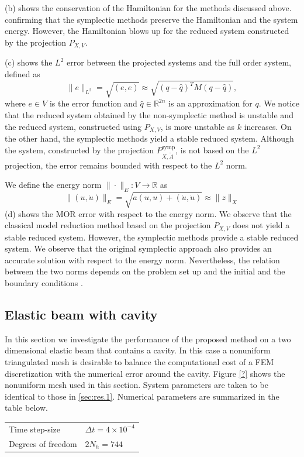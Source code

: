 (b) shows the conservation of the Hamiltonian for the methods discussed above. confirming that the symplectic methods preserve the Hamiltonian and the system energy. However, the Hamiltonian blows up for the reduced system constructed by the projection $P_{X,V}$.

(c) shows the $L^2$ error between the projected systems and the full order system, defined as
\begin{equation}
	\| e \|_{L^2} = \sqrt{(e,e)} \approx \sqrt{ (q - \hat q)^T M (q-\hat q) },
\end{equation}
where $e\in V$ is the error function and $\hat q \in \mathbb R^{2n}$ is an approximation for $q$. We notice that the reduced system obtained by the non-symplectic method is unstable and the reduced system, constructed using $P_{X,V}$, is more unstable as $k$ increases. On the other hand, the symplectic methods yield a stable reduced system. Although the system, constructed by the projection $P^{\text{symp}}_{X,\tilde A}$, is not based on the $L^2$ projection, the error remains bounded with respect to the $L^2$ norm. 

We define the energy norm $\| \cdot \|_E : V \to \mathbb R$ as
\begin{equation}
	\| (u,\dot u) \|_E = \sqrt{ a(u,u) + (\dot u , \dot u) } \approx \| z \|_X
\end{equation}
(d) shows the MOR error with respect to the energy norm. We observe that the classical model reduction method based on the projection $P_{X,V}$ does not yield a stable reduced system. However, the symplectic methods provide a stable reduced system. We observe that the original symplectic approach also provides an accurate solution with respect to the energy norm. Nevertheless, the relation between the two norms depends on the problem set up and the initial and the boundary conditions \cite{DEPARIS20094359}.

\subsection{Elastic beam with cavity} In this section we investigate the performance of the proposed method on a two dimensional elastic beam that contains a cavity. In this case a nonuniform triangulated mesh is desirable to balance the computational cost of a FEM discretization with the numerical error around the cavity. Figure \ref{?} shows the nonuniform mesh used in this section.
System parameters are taken to be identical to those in \cref{sec:res.1}. Numerical parameters are summarized in the table below.
\vspace{0.5cm}
\begin{center}
\begin{tabular}{|l|l|}
\hline
Time step-size & $\Delta t = 4\times 10^{-4}$ \\
Degrees of freedom & $2N_{h} = 744$ \\
\hline
\end{tabular}
\end{center}
\vspace{0.5cm}


